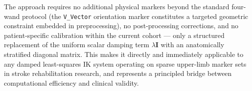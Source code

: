 \documentclass[journal,10pt,twocolumn]{IEEEtran}
\begin{document}
The approach requires no additional physical markers beyond the standard
four-wand protocol (the \texttt{V\_Vector} orientation marker constitutes
a targeted geometric constraint embedded in preprocessing), no post-processing
corrections, and no patient-specific calibration within
the current cohort --- only a structured replacement of the uniform scalar damping term $\lambda\mathbf{I}$
with an anatomically stratified diagonal matrix. This makes it directly and
immediately applicable to any damped least-squares IK system operating
on sparse upper-limb marker sets in stroke rehabilitation research,
and represents a principled bridge between computational efficiency
and clinical validity.



\end{document}

